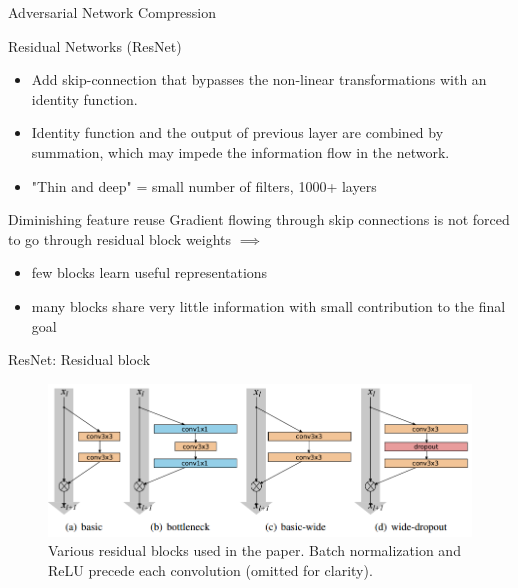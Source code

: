 \documentclass{beamer}
\begin{document}
\begin{frame}{Adversarial Network Compression}




\end{frame}
\begin{frame}{Residual Networks (ResNet)}
\begin{itemize}
\item Add skip-connection that bypasses the non-linear transformations with an identity function.
\item Identity function and the output of previous layer are combined by summation, which may impede the information flow in the network.
\item "Thin and deep" = small number of filters, 1000+ layers
\end{itemize}

\begin{block}{Diminishing feature reuse}
Gradient flowing through skip connections is not forced to go through residual block weights $\implies$ 

\begin{itemize}
\item few blocks learn useful representations 
\item many blocks share very little information with
small contribution to the final goal
\end{itemize}
\end{block}

\end{frame}
\begin{frame}{ResNet: Residual block}
\begin{figure}[h]
\includegraphics[width=\textwidth]{img/resnet_blocks}
\caption{Various residual blocks used in the paper. Batch normalization and ReLU precede
each convolution (omitted for clarity). \cite{cit:resnet}}
\end{figure}
\end{frame}
\end{document}
